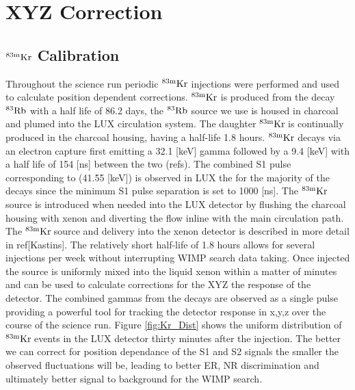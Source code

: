 
\renewcommand{\thechapter}{3}
\newcommand{\KrCal}{$\rm^{83m}Kr \: $}


\chapter{XYZ Correction}

\section{$\rm^{83m}Kr$ Calibration}

Throughout the science run periodic $\rm^{83m}Kr$ injections were performed and used to calculate position dependent corrections. $\rm ^{83m}Kr$ is produced from the decay $\rm^{83}Rb$ with a half life of 86.2 days, the $\rm^{83}Rb$ source we use is housed in charcoal and plumed into the LUX circulation system. The daughter \KrCal is continually produced in the charcoal housing, having a half-life 1.8 hours. $\rm^{83m}Kr$ decays via an electron capture first emitting a 32.1 [keV] gamma followed by a 9.4 [keV] with a half life of 154 [ns] between the two (refs). The combined S1 pulse corresponding to (41.55 [keV]) is observed in LUX the for the majority of the decays since the minimum S1 pulse separation is set to 1000 [ns]. The \KrCal source is introduced when needed into the LUX detector by flushing the charcoal housing with xenon and diverting the flow inline with the main circulation path. The \KrCal source and delivery into the xenon detector is described in more detail in ref[Kastins]. The relatively short half-life of 1.8 hours allows for several injections per week without interrupting WIMP search data taking. Once injected the source is uniformly mixed into the liquid xenon within a matter of minutes and can be used to calculate corrections for the XYZ the response of the detector. The combined gammas from the decays are observed as a single pulse providing a powerful tool for tracking the detector response in x,y,z over the course of the science run. Figure \ref{fig:Kr_Dist} shows the uniform distribution of \KrCal events in the LUX detector thirty minutes after the injection. The better we can correct for position dependance of the S1 and S2 signals the smaller the observed fluctuations will be, leading to better ER, NR discrimination and ultimately better signal to background for the WIMP search.


